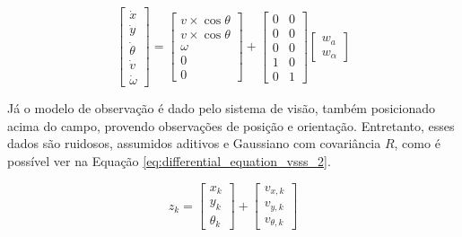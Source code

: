 \documentclass[acronym, symbols, table]{fei}
\begin{document}
		\begin{equation} \label{eq:differential_equation_vsss_1}
			\begin{bmatrix}
				\dot{x}\\ \dot{y}\\ \dot{\theta}\\ \dot{v}\\ \dot{\omega}
			\end{bmatrix} = 
			\begin{bmatrix}
				v \times \cos \theta\\ v \times \cos \theta\\ \omega\\ 0\\ 0
			\end{bmatrix} + 
			\begin{bmatrix}
				0 & 0\\ 0 & 0\\ 0 & 0\\ 1 & 0\\ 0 & 1
			\end{bmatrix}
			\begin{bmatrix}
				w_a\\ w_{\alpha}
			\end{bmatrix}
		\end{equation}
		
	Já o modelo de observação é dado pelo sistema de visão, também posicionado acima do campo, provendo observações de posição e orientação. Entretanto, esses dados são ruidosos, assumidos aditivos e Gaussiano com covariância $R$, como é possível ver na Equação \ref{eq:differential_equation_vsss_2}.
	
	\begin{equation}\label{eq:differential_equation_vsss_2}
		z_k = 
		\begin{bmatrix}
			x_k \\ y_k \\ \theta_k
		\end{bmatrix} + 
		\begin{bmatrix}
			v_{x,k} \\ v_{y,k} \\ v_{\theta,k}
		\end{bmatrix}
	\end{equation}
	
\end{document}
